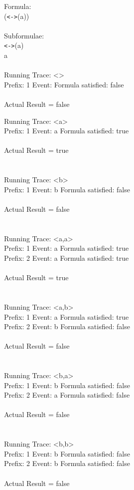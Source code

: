 Formula:\\
(\texttt{\textless -\textgreater}(a))\\
\\
Subformulae:\\
\texttt{\textless -\textgreater}(a)\\
a\\
\\
Running Trace: \textless \textgreater\\
  Prefix: 1 Event:  Formula satisfied: false\\
\\
Actual Result = false\\

\newpage

\noindent Running Trace: \textless a\textgreater\\
  Prefix: 1 Event: a Formula satisfied: true\\
\\
Actual Result = true\\
\\
\\
Running Trace: \textless b\textgreater\\
  Prefix: 1 Event: b Formula satisfied: false\\
\\
Actual Result = false\\
\\
\\
Running Trace: \textless a,a\textgreater\\
  Prefix: 1 Event: a Formula satisfied: true\\
  Prefix: 2 Event: a Formula satisfied: true\\
\\
Actual Result = true\\
\\
\\
Running Trace: \textless a,b\textgreater\\
  Prefix: 1 Event: a Formula satisfied: true\\
  Prefix: 2 Event: b Formula satisfied: false\\
\\
Actual Result = false\\
\\
\\
Running Trace: \textless b,a\textgreater\\
  Prefix: 1 Event: b Formula satisfied: false\\
  Prefix: 2 Event: a Formula satisfied: false\\
\\
Actual Result = false\\
\\
\\
Running Trace: \textless b,b\textgreater\\
  Prefix: 1 Event: b Formula satisfied: false\\
  Prefix: 2 Event: b Formula satisfied: false\\
\\
Actual Result = false\\

